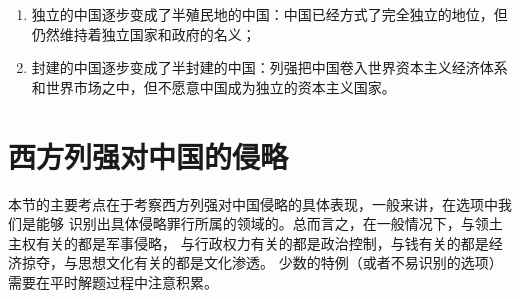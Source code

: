 \documentclass[10pt, UTF8]{book} %
\begin{document}
\begin{mdframed}[frametitle={为什么是半殖民地半封建社会？}]
    \begin{enumerate}[itemsep=0pt]
        \item 独立的中国逐步变成了半殖民地的中国：中国已经方式了完全独立的地位，但
        仍然维持着独立国家和政府的名义；
        \item 封建的中国逐步变成了半封建的中国：列强把中国卷入世界资本主义经济体系
        和世界市场之中，但不愿意中国成为独立的资本主义国家。
    \end{enumerate}
\end{mdframed}

\section{西方列强对中国的侵略}

本节的主要考点在于考察西方列强对中国侵略的具体表现，一般来讲，在选项中我们是能够
识别出具体侵略罪行所属的领域的。总而言之，在一般情况下，与领土主权有关的都是军事侵略，
与行政权力有关的都是政治控制，与钱有关的都是经济掠夺，与思想文化有关的都是文化渗透。
少数的特例（或者不易识别的选项）需要在平时解题过程中注意积累。
\end{document}
